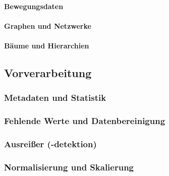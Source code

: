                 \paragraph{Bewegungsdaten} %

                \paragraph{Graphen und Netzwerke} %

                \paragraph{Bäume und Hierarchien} %

        \subsection{Vorverarbeitung} %

            \subsubsection{Metadaten und Statistik} %

            \subsubsection{Fehlende Werte und Datenbereinigung} %

            \subsubsection{Ausreißer (-detektion)} %

            \subsubsection{Normalisierung und Skalierung} %

